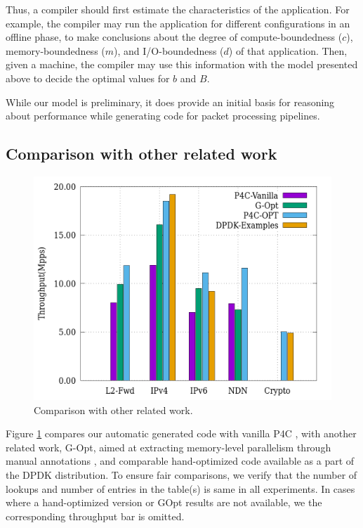 Thus, a compiler should first estimate the characteristics of the application. For example,
the compiler may run the application for different configurations in an offline
phase, to make conclusions about the degree of compute-boundedness ($c$), memory-boundedness ($m$),
and I/O-boundedness ($d$) of that application. Then, given a machine, the compiler may
use this information with the model
presented above to decide the optimal values for $b$ and $B$.

While our model is preliminary, it does provide an initial basis for reasoning about
performance while generating code for packet processing pipelines.

\subsection{Comparison with other related work}
\label{comparisonexperiment}
\begin{figure}[ht]
\includegraphics[width = \linewidth]{Figures/comparison.png}
\caption{Comparison with other related work.}
\label{comparisonfigure}
\end{figure}
Figure \ref{comparisonfigure} compares our automatic generated code with vanilla P4C \cite{Laki:2016:HSP:2934872.2959080},
with another
related work, G-Opt, aimed at extracting memory-level parallelism through manual annotations \cite{189006},
and comparable
hand-optimized code available as a part of the DPDK distribution.
To ensure fair comparisons, we verify that the number of lookups and number of entries in the table(s) is same in all experiments.
In cases where a hand-optimized version or GOpt results are not available, we
the corresponding throughput bar is omitted.

